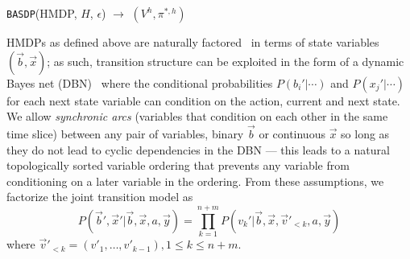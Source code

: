 \incmargin{1.5em}
\linesnumbered
\begin{algorithm}[t!]
\vspace{-.5mm}
\dontprintsemicolon
{}
\caption{\footnotesize \texttt{BASDP}(HMDP, $H$, $\epsilon$) $\longrightarrow$ $(V^h,\pi^{*,h})$ \label{alg:basdp}}
\vspace{-1mm}
\end{algorithm}
\decmargin{1.5em}

HMDPs as defined above are naturally factored~\cite{boutilier99dt} in
terms of state variables $(\vec{b},\vec{x})$; as such, transition
structure can be exploited in the form of a dynamic Bayes net
(DBN)~\cite{dbn} where the conditional probabilities $P(b_i'|\cdots)$
and $P(x_j'|\cdots)$ for each next state variable can condition on the
action, current and next state.  We allow
\emph{synchronic arcs} (variables that condition on each
other in the same time slice) between any pair of variables, binary
$\vec{b}$ or continuous $\vec{x}$ so long as they do not lead
to cyclic dependencies in the DBN --- this leads to a natural topologically
sorted variable ordering that prevents any variable from conditioning on
a later variable in the ordering.  From these assumptions, we factorize
the joint transition model as 
\begin{equation}
P(\vec{b}',\vec{x}'|\vec{b},\vec{x},a,\vec{y}) = 
\prod_{k=1}^{n+m} P(v_k'| \vec{b},\vec{x}, \vec{v}'_{<k}, a,\vec{y}) \nonumber %
\end{equation}%
\noindent where $\vec{v}'_{<k} = ( v'_1,\ldots, v'_{k-1}), 1\leq k \leq n+m$.

